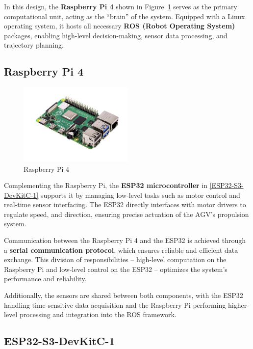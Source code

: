 \documentclass[../../main]{subfiles}
\begin{document}
In this design, the \textbf{Raspberry Pi 4} shown in Figure~\cref{Raspberry Pi 4} serves as the primary 
computational unit, acting as the ``brain'' of the system. Equipped 
with a Linux operating system, it hosts all necessary 
\textbf{ROS (Robot Operating System)} packages, enabling high-level 
decision-making, sensor data processing, and trajectory planning.


\subsection{Raspberry Pi 4}

\begin{figure}[H]
    \centering
    \includegraphics[width=0.5\textwidth]{fig/raspberry.png}
    \caption{ Raspberry Pi 4}
    \label{Raspberry Pi 4} %
\end{figure}

Complementing the Raspberry Pi, the \textbf{ESP32 microcontroller} in \cref{ESP32-S3-DevKitC-1} 
supports it by managing low-level tasks 
such as motor control and real-time sensor interfacing. The ESP32 
directly interfaces with motor drivers to regulate speed, 
and direction, ensuring precise actuation of the AGV's propulsion 
system.

Communication between the Raspberry Pi 4 and the ESP32 is achieved 
through a \textbf{serial communication protocol}, which ensures 
reliable and efficient data exchange. This division of responsibilities 
-- high-level computation on the Raspberry Pi and low-level control 
on the ESP32 -- optimizes the system's performance and reliability.

Additionally, the sensors are shared between both components, with 
the ESP32 handling time-sensitive data acquisition and the Raspberry 
Pi performing higher-level processing and integration into the ROS 
framework.

\subsection{ESP32-S3-DevKitC-1}
\end{document}
